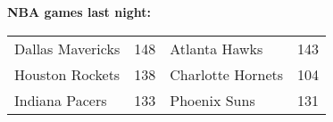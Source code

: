 \textbf{NBA games last night:}
\begin{tabular}{llll}
\toprule
Dallas Mavericks & 148 &     Atlanta Hawks & 143 \\
 Houston Rockets & 138 & Charlotte Hornets & 104 \\
  Indiana Pacers & 133 &      Phoenix Suns & 131 \\
\bottomrule
\end{tabular}
